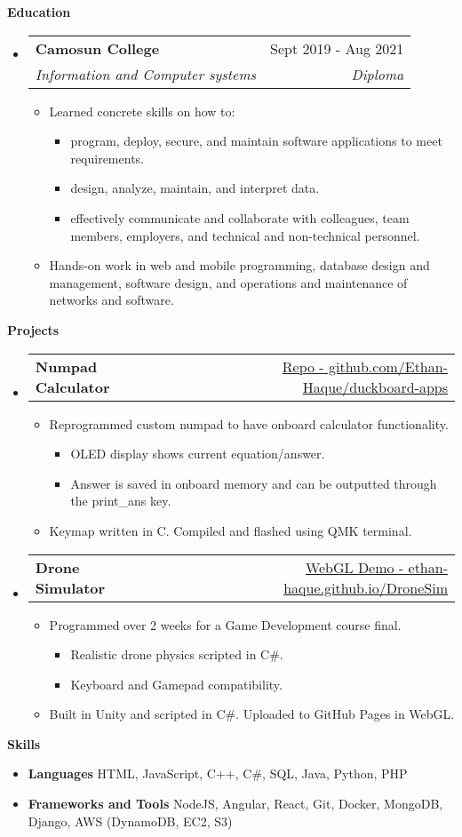 \documentclass[letterpaper,12pt]{article}[leftmargin=*]
\makeatletter
\def \entryspacing {-0pt}
\renewcommand{\section}[2]{\vspace{5pt}
  \colorbox{secondary}{\color{white}\raggedbottom\normalsize\textbf{{#1}{\hspace{7pt}#2}}}
}
\newcommand{\resumeEntryStart}{\begin{itemize}[leftmargin=2.5mm]}
\newcommand{\resumeEntryEnd}{\end{itemize}\vspace{\entryspacing}}
\newcommand{\resumeItemListStart}{\begin{itemize}[leftmargin=4.5mm]}
\newcommand{\resumeItemListEnd}{\end{itemize}}
\newcommand{\resumeItem}[1]{
  \item\small{
    {#1 \vspace{-2pt}}
  }
}
\newcommand{\resumeEntryTSDL}[4]{
  \vspace{-1pt}\item[]
    \begin{tabularx}{0.97\textwidth}{X@{\hspace{60pt}}r}
      \textbf{\color{primary}#1} & {\firabook\color{accent}\small#2} \\
      \textit{\color{accent}\small#3} & \textit{\color{accent}\small#4} \\
    \end{tabularx}\vspace{-6pt}
}
\newcommand{\resumeEntryTD}[2]{
  \vspace{-1pt}\item[]
    \begin{tabularx}{0.97\textwidth}{X@{\hspace{60pt}}r}
      \textbf{\color{primary}#1} & {\firabook\color{accent}\small#2} \\
    \end{tabularx}\vspace{-6pt}
}
\newcommand{\resumeEntryS}[2]{
  \item[]\small{
    \textbf{\color{primary}#1 }{ #2 \vspace{-6pt}}
  }
}
\makeatother
\begin{document}
\section{\faGraduationCap}{Education}
  \resumeEntryStart
    \resumeEntryTSDL
      {Camosun College}{Sept 2019 - Aug 2021}
      {Information and Computer systems}{Diploma}
      \resumeItemListStart
        \resumeItem {Learned concrete skills on how to:}
          \resumeItemListStart
            \resumeItem {program, deploy, secure, and maintain software applications to meet requirements.}
            \resumeItem {design, analyze, maintain, and interpret data.}
            \resumeItem {effectively communicate and collaborate with colleagues, team members, employers, and technical and non-technical personnel.}
          \resumeItemListEnd
        \resumeItem {Hands-on work in web and mobile programming, database design and management, software design, and operations and maintenance of networks and software.}
      \resumeItemListEnd
  \resumeEntryEnd
  
  
\section{\faFlask}{Projects}
\resumeEntryStart
    \resumeEntryTD
      {Numpad Calculator}{\href{https://github.com/Ethan-Haque/duckboard-apps}{Repo - github.com/Ethan-Haque/duckboard-apps}}
      \resumeItemListStart
        \resumeItem {Reprogrammed custom numpad to have onboard calculator functionality.}
        \resumeItemListStart
          \resumeItem {OLED display shows current equation/answer.}
          \resumeItem {Answer is saved in onboard memory and can be outputted through the print\_ans key.}
        \resumeItemListEnd
        \resumeItem {Keymap written in C. Compiled and flashed using QMK terminal.}
      \resumeItemListEnd
  \resumeEntryEnd
  
  \resumeEntryStart
    \resumeEntryTD
      {Drone Simulator}{\href{https://ethan-haque.github.io/DroneSim/}{WebGL Demo - ethan-haque.github.io/DroneSim}}
    \resumeItemListStart
      \resumeItem {Programmed over 2 weeks for a Game Development course final.}
      \resumeItemListStart
        \resumeItem {Realistic drone physics scripted in C\#.}
        \resumeItem {Keyboard and Gamepad compatibility.}
      \resumeItemListEnd
      \resumeItem {Built in Unity and scripted in C\#. Uploaded to GitHub Pages in WebGL.}
    \resumeItemListEnd
  \resumeEntryEnd

\section{\faGears}{Skills}
\resumeEntryStart
  \resumeEntryS{Languages} {HTML, JavaScript, C++, C\#, SQL, Java, Python, PHP}
  \resumeEntryS{Frameworks and Tools} {NodeJS, Angular, React, Git, Docker, MongoDB, Django, AWS (DynamoDB, EC2, S3)}
\resumeEntryEnd
\end{document}
